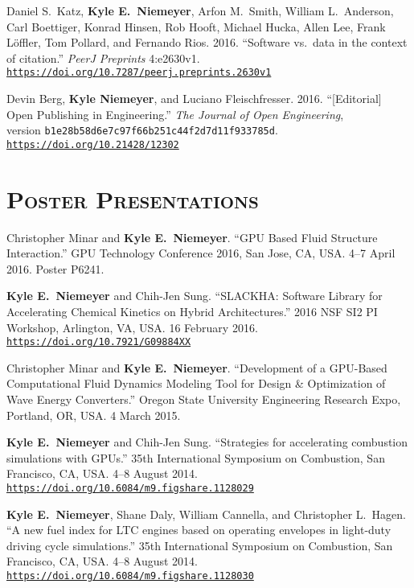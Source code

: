 \documentclass[margin,line,11pt]{res}
\makeatletter
\newlength{\bibhang}
\newlength{\bibsep}
 {\@listi \global\bibsep\itemsep \global\advance\bibsep by\parsep}
\newenvironment{bibenum*}
  {\renewcommand\labelenumi{\theenumi.}%
   \etaremune[
     topsep=0pt,
     itemsep=\bibsep,
     parsep=0pt,partopsep=0pt,
     itemindent=-\bibhang,
     leftmargin={\bibhang+\widthof{[999]}}]}
  {\endetaremune}
\newcommand*{\doi}[1]{\href{https://doi.org/#1}{\nolinkurl{https://doi.org/#1}}}
\makeatother
\begin{document}
\begin{resume}
\begin{bibenum*}
\item Daniel S.\ Katz, \textbf{Kyle E.\ Niemeyer}, Arfon M.\ Smith, William L.\ Anderson,
Carl Boettiger, Konrad Hinsen, Rob Hooft, Michael Hucka, Allen Lee, Frank Löffler,
Tom Pollard, and Fernando Rios.
2016.
``Software vs.\ data in the context of citation.''
\textit{PeerJ Preprints} 4:e2630v1.
\doi{10.7287/peerj.preprints.2630v1}

\item Devin Berg, \textbf{Kyle Niemeyer}, and Luciano Fleischfresser.
2016.
``[Editorial] Open Publishing in Engineering.''
\textit{The Journal of Open Engineering}, \\
version \texttt{b1e28b58d6e7c97f66b251c44f2d7d11f933785d}.
\doi{10.21428/12302}

\end{bibenum*}

\section{\textsc{Poster Presentations}}

\begin{bibenum*}

\item Christopher Minar and \textbf{Kyle E.\ Niemeyer}.
``GPU Based Fluid Structure Interaction.''
GPU Technology Conference 2016, San Jose, CA, USA.
4--7 April 2016.
Poster P6241.

\item \textbf{Kyle E.\ Niemeyer} and Chih-Jen Sung.
``SLACKHA: Software Library for Accelerating Chemical Kinetics on Hybrid Architectures.'' 2016 NSF SI2 PI Workshop, Arlington, VA, USA.
16 February 2016.
\doi{10.7921/G09884XX}

\item Christopher Minar and \textbf{Kyle E.\ Niemeyer}.
``Development of a GPU-Based Computational Fluid Dynamics Modeling Tool for Design \& Optimization of Wave Energy Converters.''
Oregon State University Engineering Research Expo, Portland, OR, USA.
4 March 2015.

\item \textbf{Kyle E.\ Niemeyer} and Chih-Jen Sung.
``Strategies for accelerating combustion simulations with GPUs.''
35th International Symposium on Combustion, San Francisco, CA, USA.
4--8 August 2014.
\doi{10.6084/m9.figshare.1128029}

\item \textbf{Kyle E.\ Niemeyer}, Shane Daly, William Cannella, and Christopher L.\ Hagen.
``A new fuel index for LTC engines based on operating envelopes in light-duty driving cycle simulations.''
35th International Symposium on Combustion, San Francisco, CA, USA.
4--8 August 2014.
\doi{10.6084/m9.figshare.1128030}


\end{bibenum*}
\end{resume}
\end{document}
